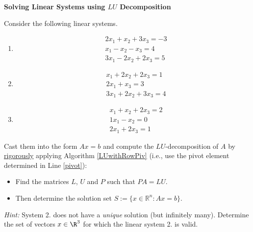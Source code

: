 \textbf{Solving Linear Systems using $LU$ Decomposition}

Consider the following linear systems.
\begin{enumerate}
	\item 		\begin{align*}
	&2 x_1 + x_2 + 3x_3 = -3\\
	&x_1 - x_2 - x_3 = 4\\
	&3x_1 - 2x_2 + 2x_3 = 5
	\end{align*}
	\item \begin{align*}
	&x_1 + 2 x_2 + 2x_3  = 1\\
	&2x_1 + x_3 = 3\\
	&3x_1 + 2x_2 + 3x_3 = 4
	\end{align*}
	\item \begin{align*}
			&x_1 +  x_2 + 2x_3  = 2\\
			&1x_1 -x_2 = 0\\
			&2x_1 + 2x_3 = 1
\end{align*}
\end{enumerate}
Cast them into the form $Ax = b$ and compute the $LU$-decomposition of $A$ by \underline{rigorously} applying Algorithm \ref{LUwithRowPiv} (i.e., use the pivot element determined in Line \ref{pivot}):
\begin{itemize}
	\item  Find the matrices $L$, $U$ and $P$ such that $PA=LU$.
	\item Then determine the solution set $S:= \{x\in \mathbb{R}^n:Ax =b  \}$.
\end{itemize}
\textit{Hint: } System 2. does not have a \textit{unique} solution (but infinitely many). Determine the set of vectors $x\in \R^3$ for which the linear system 2. is valid.
